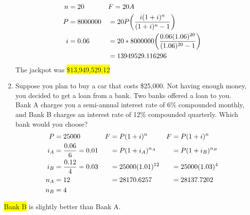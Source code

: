 \documentclass[12pt]{article}
\newcommand{\hilight}[1]{\colorbox{yellow}{#1}}
\begin{document}
\begin{enumerate}[label=\textbf{Q\arabic*}]
\begin{align*}
n &= 20 &\vspace{20pt} &F=20A\\
P &= 8000000 & &=20P\bigg ( \frac{i(1+i)^n}{(1+i)^n-1} \bigg )\\
i &= 0.06 & &=20*8000000\bigg ( \frac{0.06(1.06)^{20}}{(1.06)^{20}-1} \bigg )\\
& & &=13949529.116296\\
\end{align*}
The jackpot was \hilight{\$13,949,529.12}
\item Suppose you plan to buy a car that costs \$25,000. Not having enough money, you decided to get a loan from a bank. Two banks offered a loan to you. Bank A charges you a semi-annual interest rate of 6\% compounded monthly, and Bank B charges an interest rate of 12\% compounded quarterly. Which bank would you choose?
\begin{align*}
P &= 25000 &\vspace{20pt} F&=P(1+i)^n &\vspace{20pt} F&=P(1+i)^n\\
i_A &=\frac{0.06}{6}= 0.01 & &=P(1+i_A)^{n_A} & &=P(1+i_B)^{n_B}\\
i_B &=\frac{0.12}{4}=0.03  & &=25000(1.01)^{12} & &=25000(1.03)^4\\
n_A &=12 & &=28170.6257 & &=28137.7202\\
n_B &=4 \\
\end{align*}
\end{enumerate}
\hilight{Bank B} is slightly better than Bank A.
\end{document}

